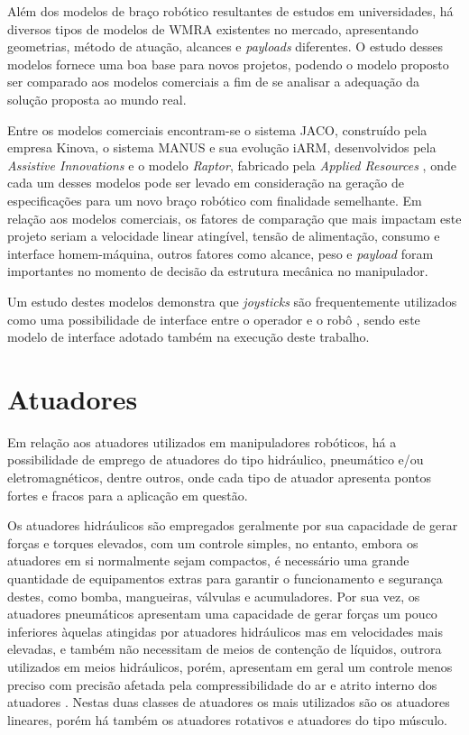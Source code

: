 Além dos modelos de braço robótico resultantes de estudos em universidades, 
há diversos tipos de modelos de WMRA existentes no mercado, apresentando 
geometrias, método de atuação, alcances e \textit{payloads} diferentes. 
O estudo desses modelos fornece uma boa base para novos projetos, podendo 
o modelo proposto ser comparado aos modelos comerciais a fim de se analisar 
a adequação da solução proposta ao mundo real.

Entre os modelos comerciais encontram-se o sistema JACO, construído pela empresa Kinova, o sistema MANUS e sua evolução iARM, desenvolvidos pela \textit{Assistive
Innovations} e o modelo \textit{Raptor}, fabricado pela \textit{Applied Resources} \cite{ktistakis2015survey}, onde cada um desses modelos pode ser levado em 
consideração na geração de especificações para um novo braço robótico com finalidade semelhante.
Em relação aos modelos comerciais, os fatores de comparação que mais
impactam este projeto seriam a velocidade linear atingível, tensão de 
alimentação, consumo e interface homem-máquina, outros fatores como alcance, peso e \textit{payload}
foram importantes no momento de decisão da estrutura mecânica no manipulador. 

Um estudo destes modelos demonstra que \textit{joysticks} são frequentemente 
utilizados como uma possibilidade de interface entre o operador e o robô \cite{capille2010kinematic},
sendo este modelo de interface adotado também na execução deste trabalho.

\section{Atuadores}
Em relação aos atuadores utilizados em manipuladores robóticos, há a possibilidade de emprego de atuadores do tipo hidráulico, pneumático e/ou eletromagnéticos, 
dentre outros, onde cada tipo de atuador apresenta pontos fortes e fracos para a aplicação em questão. 

Os atuadores hidráulicos são empregados geralmente por sua capacidade de gerar forças e torques elevados, com um controle simples, no entanto, embora os 
atuadores em si normalmente sejam compactos, é necessário uma grande quantidade de equipamentos extras para garantir o funcionamento e segurança destes, como
bomba, mangueiras, válvulas e acumuladores. Por sua vez, os atuadores pneumáticos apresentam uma capacidade de gerar forças um pouco inferiores àquelas atingidas 
por atuadores hidráulicos mas em velocidades mais elevadas, e também não necessitam de meios de contenção de líquidos, outrora utilizados em meios hidráulicos, 
porém, apresentam em geral um controle menos preciso com precisão afetada pela compressibilidade do ar e atrito interno dos atuadores \cite{hunter1991comparative}. 
Nestas duas classes de atuadores os mais utilizados são os atuadores lineares, porém há também os atuadores rotativos e atuadores do tipo músculo.

